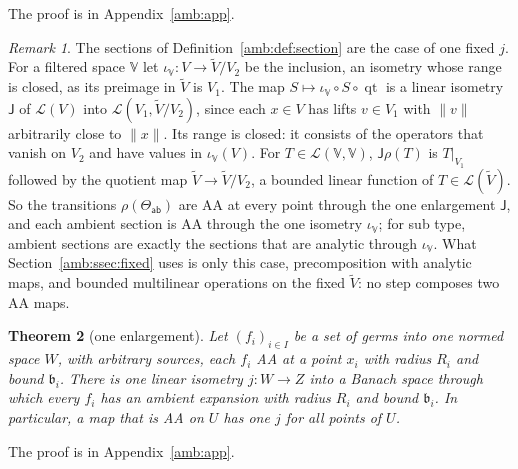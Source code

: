 \documentclass[11pt]{amsart}
\newtheorem{theorem}{Theorem}[section]
\theoremstyle{definition}
\theoremstyle{remark}
\newtheorem{remark}[theorem]{Remark}
\numberwithin{equation}{section}
\newcommand{\cL}{\mathcal L}
\newcommand{\norm}[1]{\lVert #1\rVert}
\theoremstyle{plain}
\theoremstyle{definition}
\theoremstyle{plain}
\begin{document}
The proof is in Appendix~\ref{amb:app}.

\begin{remark}\label{amb:rem:one-envelope}
The sections of Definition~\ref{amb:def:section} are the case of one fixed $j$. For a filtered space $\mathbb V$ let $\iota_{\mathbb V}\colon V\to\tilde V/V_2$ be the inclusion, an isometry whose range is closed, as its preimage in $\tilde V$ is $V_1$. The map $S\mapsto\iota_{\mathbb V}\circ S\circ\operatorname{qt}$ is a linear isometry $\mathsf J$ of $\cL(V)$ into $\cL(V_1,\tilde V/V_2)$, since each $x\in V$ has lifts $v\in V_1$ with $\norm v$ arbitrarily close to $\norm x$. Its range is closed: it consists of the operators that vanish on $V_2$ and have values in $\iota_{\mathbb V}(V)$. For $T\in\cL(\mathbb V,\mathbb V)$, $\mathsf J\rho(T)$ is $T|_{V_1}$ followed by the quotient map $\tilde V\to\tilde V/V_2$, a bounded linear function of $T\in\cL(\tilde V)$. So the transitions $\rho(\Theta_{\mathsf{ab}})$ are AA at every point through the one enlargement $\mathsf J$, and each ambient section is AA through the one isometry $\iota_{\mathbb V}$; for sub type, ambient sections are exactly the sections that are analytic through $\iota_{\mathbb V}$. What Section~\ref{amb:ssec:fixed} uses is only this case, precomposition with analytic maps, and bounded multilinear operations on the fixed $\tilde V$: no step composes two AA maps.
\end{remark}

\begin{theorem}[one enlargement]\label{amb:thm:one-enlargement}
Let $(f_i)_{i\in I}$ be a set of germs into one normed space $W$, with arbitrary sources, each $f_i$ AA at a point $x_i$ with radius $R_i$ and bound $\mathfrak b_i$. There is one linear isometry $j\colon W\to Z$ into a Banach space through which every $f_i$ has an ambient expansion with radius $R_i$ and bound $\mathfrak b_i$. In particular, a map that is AA on $U$ has one $j$ for all points of $U$.
\end{theorem}

The proof is in Appendix~\ref{amb:app}.
\end{document}
